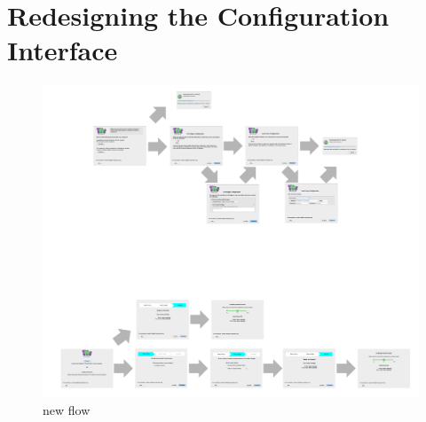 \documentclass{template}
\begin{document}
\section{Redesigning the Configuration Interface}

\begin{figure}[t]
	\centering
		\includegraphics[width=1.0\textwidth]{new-flow.pdf} 
		\caption{new flow} 
\end{figure} 
\end{document}
